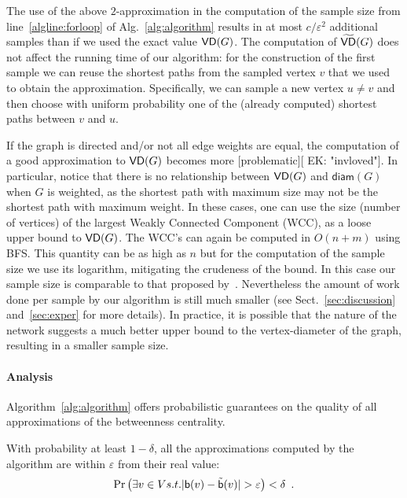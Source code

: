 The use of the above $2$-approximation in the computation of the
sample size from line~\ref{algline:forloop} of Alg.~\ref{alg:algorithm} results
in at most $c/\varepsilon^2$ additional samples than if we
used the exact value $\mathsf{VD}(G)$. The computation of $\widetilde{\mathsf{VD}}(G)$
does not affect the running time of our algorithm: for the construction of
the first sample we can reuse the shortest paths from the sampled
vertex $v$ that we used to obtain the approximation. Specifically, we can sample
a new vertex $u\neq v$ and then choose with uniform probability one of the
(already computed) shortest paths between $v$ and $u$.

If the graph is directed and/or not all edge weights are equal, the computation
of a good approximation to $\mathsf{VD}(G)$ becomes more [problematic][ EK: "invloved"]. In particular,
notice that there is no relationship between $\mathsf{VD}(G)$ and $\mathsf{diam}(G)$
when $G$ is weighted, as the shortest path with maximum size may not be the
shortest path with maximum weight. In these cases, one can use the size (number
of vertices) of the largest Weakly Connected Component (WCC), as a loose upper
bound to $\mathsf{VD}(G)$. The WCC's can again be computed in $O(n+m)$ using BFS.  This
quantity can be as high as $n$ but for the computation of the sample size we use
its logarithm, mitigating the crudeness of the bound. In this case our sample
size is comparable to that proposed by~\citet{BrandesP07}. %
Nevertheless the amount of work done per sample by our algorithm is still much
smaller (see Sect.~\ref{sec:discussion} and~\ref{sec:exper} for more
details). In practice, it is possible that the nature of the network suggests a
much better upper bound to the vertex-diameter of the graph, resulting in a
smaller sample size. %

\paragraph{Analysis}\label{sec:analysis}
Algorithm~\ref{alg:algorithm} offers
probabilistic guarantees on the quality of all approximations of the betweenness
centrality.
\begin{lemma}\label{lem:correctness}
  With probability at least $1-\delta$, all the approximations computed by the
  algorithm are within $\varepsilon$ from their real value:
  \[
  \Pr\left(\exists v\in V \mbox{ s.t. }
  |\betw(v)-\tilde\betw(v)|>\varepsilon\right)<\delta\enspace .
  \]
\end{lemma}

